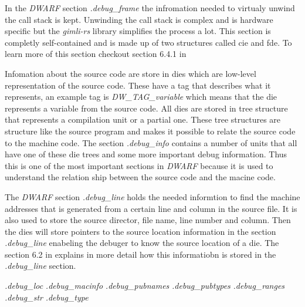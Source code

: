 In the \emph{DWARF} section \emph{.debug\_frame} the infromation needed to virtualy unwind the call stack is kept.
Unwinding the call stack is complex and is hardware specific but the \emph{gimli-rs} library simplifies the process a lot.
This section is completly self-contained and is made up of two structures called \acrfull{cie} and \acrfull{fde}.
To learn more of this section checkout section 6.4.1 in \cite{dwarf}


Infomation about the source code are store in \glspl{die} which are low-level representation of the source code.
These have a tag that describes what it represents, an example tag is \emph{DW\_TAG\_variable} which means that the \gls{die} represents a variable from the source code.
All \glspl{die} are stored in tree structure that represents a compilation unit or a partial one.
These tree structures are structure like the source program and makes it possible to relate the source code to the machine code.
The section \emph{.debug\_info} contains a number of units that all have one of these \gls{die} trees and some more important debug information.
Thus this is one of the most important sections in \emph{DWARF} because it is used to understand the relation ship between the source code and the macine code.


The \emph{DWARF} section \emph{.debug\_line} holds the needed informtion to find the machine addresses that is generated from a certain line and column in the source file.
It is also used to store the source director, file name, line number and column.
Then the \glspl{die} will store pointers to the source location information in the section \emph{.debug\_line} enabeling the debuger to know the source location of a \gls{die}.
The section 6.2 in \cite{dwarf} explains in more detail how this informatiobn is stored in the \emph{.debug\_line} section.


\emph{.debug\_loc}
\emph{.debug\_macinfo}
\emph{.debug\_pubnames}
\emph{.debug\_pubtypes}
\emph{.debug\_ranges}
\emph{.debug\_str}
\emph{.debug\_type}

